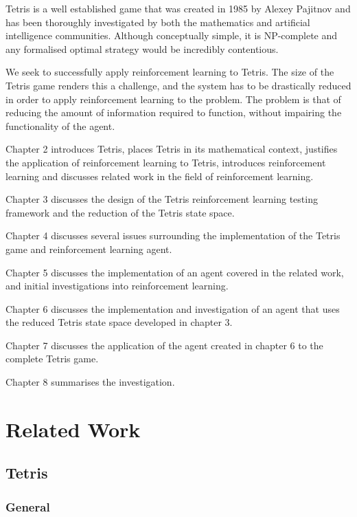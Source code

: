 \documentclass{rucsthesis}
\begin{document}
Tetris is a well established game that was created in 1985 by Alexey Pajitnov and has been thoroughly investigated by both the mathematics and artificial intelligence communities. Although conceptually simple, it is NP-complete \citep{hardtet} and any formalised optimal strategy would be incredibly contentious.

We seek to successfully apply reinforcement learning to Tetris. The size of the Tetris game renders this a challenge, and the system has to be drastically reduced in order to apply reinforcement learning to the problem. The problem is that of reducing the amount of information required to function, without impairing the functionality of the agent.

Chapter 2 introduces Tetris, places Tetris in its mathematical context, justifies the application of reinforcement learning to Tetris, introduces reinforcement learning and discusses related work in the field of reinforcement learning.

Chapter 3 discusses the design of the Tetris reinforcement learning testing framework and the reduction of the Tetris state space.

Chapter 4 discusses several issues surrounding the implementation of the Tetris game and reinforcement learning agent.

Chapter 5 discusses the implementation of an agent covered in the related work, and initial investigations into reinforcement learning.

Chapter 6 discusses the implementation and investigation of an agent that uses the reduced Tetris state space developed in chapter 3.

Chapter 7 discusses the application of the agent created in chapter 6 to the complete Tetris game.

Chapter 8 summarises the investigation.

\chapter{Related Work}

\section{Tetris}

\subsection{General}
\end{document}
